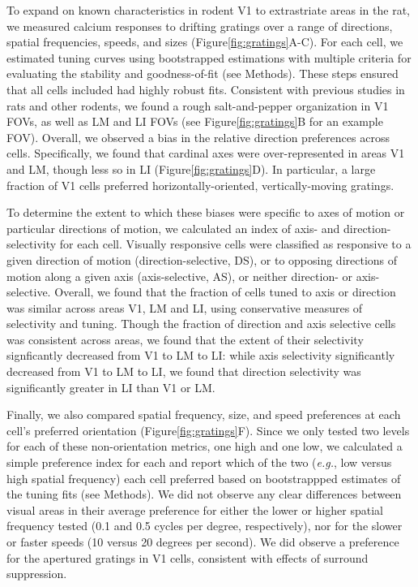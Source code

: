 To expand on known characteristics in rodent V1 to extrastriate areas in the rat, we measured calcium responses to drifting gratings over a range of directions, spatial frequencies, speeds, and sizes (Figure\ref{fig:gratings}A-C). For each cell, we estimated tuning curves using bootstrapped estimations with multiple criteria for evaluating the stability and goodness-of-fit (see Methods)\cite{Liang2018}. These steps ensured that all cells included had highly robust fits. Consistent with previous studies in rats and other rodents, we found a rough salt-and-pepper organization in V1 FOVs, as well as LM and LI FOVs (see Figure\ref{fig:gratings}B for an example FOV). Overall, we observed a bias in the relative direction preferences across cells. Specifically, we found that cardinal axes were over-represented in areas V1 and LM, though less so in LI (Figure\ref{fig:gratings}D). In particular, a large fraction of V1 cells preferred horizontally-oriented, vertically-moving gratings.  

To determine the extent to which these biases were specific to axes of motion or particular directions of motion, we calculated an index of axis- and direction-selectivity for each cell. Visually responsive cells were classified as responsive to a given direction of motion (direction-selective, DS), or to opposing directions of motion along a given axis (axis-selective, AS), or neither direction- or axis-selective. Overall, we found that the fraction of cells tuned to axis or direction was similar across areas V1, LM and LI, using conservative measures of selectivity and tuning. Though the fraction of direction and axis selective cells was consistent across areas,  we found that the extent of their selectivity signficantly decreased from V1 to LM to LI: while axis selectivity significantly decreased from V1 to LM to LI, we found that direction selectivity was significantly greater in LI than V1 or LM. 

Finally, we also compared spatial frequency, size, and speed preferences at each cell's preferred orientation (Figure\ref{fig:gratings}F). Since we only tested two levels for each of these non-orientation metrics, one high and one low, we calculated a simple preference index for each and report which of the two (\textit{e.g.}, low versus high spatial frequency) each cell preferred based on bootstrappped estimates of the tuning fits (see Methods). We did not observe any clear differences between visual areas in their average preference for either the lower or higher spatial frequency tested (0.1 and 0.5 cycles per degree, respectively), nor for the slower or faster speeds (10 versus 20 degrees per second). We did observe a preference for the apertured gratings in V1 cells, consistent with effects of surround suppression.

